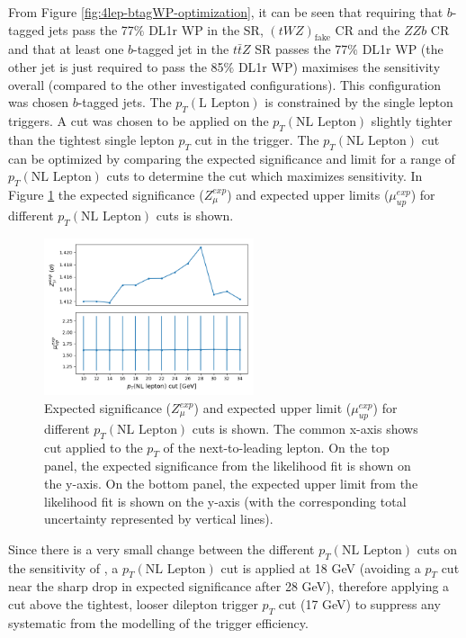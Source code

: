 From Figure \ref{fig:4lep-btagWP-optimization}, it can be seen that requiring that $b$-tagged jets pass the 77$\%$ DL1r WP in the \tWZ SR, $(tWZ)_{\text{fake}}$ CR and the $ZZb$ CR and that at least one $b$-tagged jet in the $t\bar{t}Z$ SR passes the 77$\%$ DL1r WP (the other jet is just required to pass the 85$\%$ DL1r WP) maximises the sensitivity overall (compared to the other investigated configurations). This configuration was chosen $b$-tagged jets. The $p_{T}(\text{L Lepton})$ is constrained by the single lepton triggers. A cut was chosen to be applied on the $p_{T}(\text{NL Lepton})$ slightly tighter than the tightest single lepton $p_{T}$ cut in the trigger. The $p_{T}(\text{NL Lepton})$ cut can be optimized by comparing the expected significance and limit for a range of $p_{T}{(\text{NL Lepton})}$ cuts to determine the cut which maximizes sensitivity. In Figure \ref{fig:4lep-NLlep-optimization} the expected significance ($Z_{\mu}^{exp}$) and expected upper limits ($\mu_{up}^{exp}$) for different $p_{T}(\text{NL Lepton})$ cuts is shown.
\begin{figure}[h!]
	\includegraphics[width = 0.55\textwidth]{figures/NL_Lep_optimization.png}
  \centering
	\caption{Expected significance ($Z_{\mu}^{exp}$) and expected upper limit ($\mu_{up}^{exp}$) for different $p_{T}(\text{NL Lepton})$ cuts is shown. The common x-axis shows cut applied to the $p_{T}$ of the next-to-leading lepton. On the top panel, the expected significance from the likelihood fit is shown on the y-axis. On the bottom panel, the expected upper limit from the likelihood fit is shown on the y-axis (with the corresponding total uncertainty represented by vertical lines).}
	\label{fig:4lep-NLlep-optimization}
\end{figure}

Since there is a very small change between the different $p_{T}(\text{NL Lepton})$ cuts on the sensitivity of \tWZ, a $p_{T}(\text{NL Lepton})$ cut is applied at 18 GeV (avoiding a $p_{T}$ cut near the sharp drop in expected significance after 28 GeV), therefore applying a cut above the tightest, looser dilepton trigger $p_{T}$ cut (17 GeV) to suppress any systematic from the modelling of the trigger efficiency.

